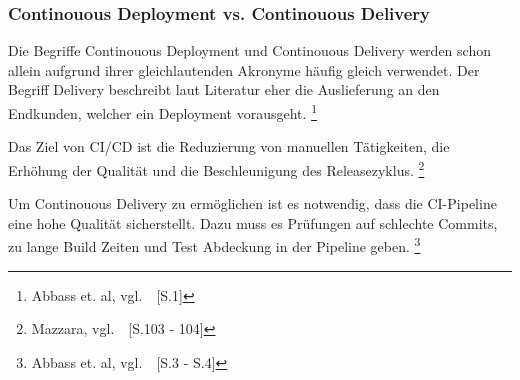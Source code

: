\subsubsection{Continouous Deployment vs. Continouous Delivery}\label{cd_vs_cd}

Die Begriffe Continouous Deployment und Continouous Delivery werden schon allein aufgrund ihrer gleichlautenden Akronyme häufig gleich verwendet.
Der Begriff Delivery beschreibt laut Literatur eher die Auslieferung an den Endkunden, welcher ein Deployment vorausgeht. \footnote{Abbass et. al, vgl.~\cite{Abbass2019}~[S.1]}

Das Ziel von CI/CD ist die Reduzierung von manuellen Tätigkeiten, die Erhöhung der Qualität und die Beschleunigung des Releasezyklus.
\footnote{Mazzara, vgl.~\cite{Mazzara2019}~[S.103 - 104]}

Um Continouous Delivery zu ermöglichen ist es notwendig, dass die CI-Pipeline eine hohe Qualität sicherstellt.
Dazu muss es Prüfungen auf schlechte Commits, zu lange Build Zeiten und Test Abdeckung in der Pipeline geben.
\footnote{Abbass et. al, vgl.~\cite{Abbass2019}~[S.3 - S.4]}

